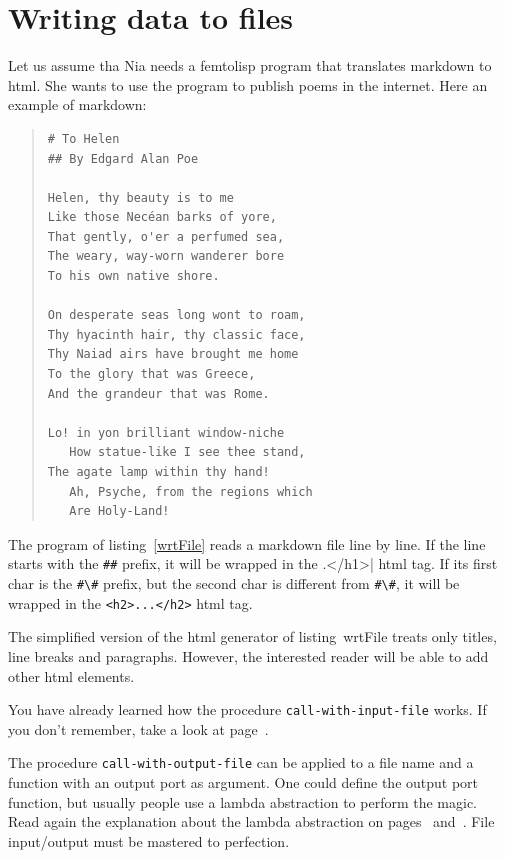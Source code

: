 \documentclass[a4paper,12pt]{book}
\begin{document}
\section{Writing data to files}
Let us assume tha Nia needs 
a femtolisp program that translates
markdown to html. She wants to
use the program to publish poems
in the internet. Here an example
of markdown:
\begin{quote}
\begin{verbatim}
# To Helen
## By Edgard Alan Poe

Helen, thy beauty is to me
Like those Necéan barks of yore,
That gently, o'er a perfumed sea,
The weary, way-worn wanderer bore
To his own native shore.

On desperate seas long wont to roam,
Thy hyacinth hair, thy classic face,
Thy Naiad airs have brought me home
To the glory that was Greece,
And the grandeur that was Rome.

Lo! in yon brilliant window-niche 
   How statue-like I see thee stand, 
The agate lamp within thy hand! 
   Ah, Psyche, from the regions which 
   Are Holy-Land! 
\end{verbatim}
\end{quote}

The program of listing~\ref{wrtFile}
reads a markdown file line by line.
If the line starts with the \verb|##| prefix,
it will be wrapped in the \verb<h1>...</h1>|
html tag. If its first char is the \verb|#\#|
prefix, but the second char is different
from \verb|#\#|, it will be wrapped in
the \verb|<h2>...</h2>| html tag.

The simplified version of the html
generator of listing~{wrtFile} treats
only titles, line breaks and paragraphs.
However, the interested reader will
be able to add other html elements.

You have already learned how the
procedure \verb|call-with-input-file| works.
If you don't remember, take a look at
page~\pageref{page:call-with-input-file}.

The procedure
\verb|call-with-output-file|
can be applied to a file name and a function
with an output port as argument. One could
define the output port function, but
usually people use a lambda abstraction
to perform the magic. Read again the
explanation about the lambda abstraction
on pages~\pageref{page:lambda1}
and~\pageref{page:lambda2}. File input/output
must be mastered to perfection.
\end{document}
